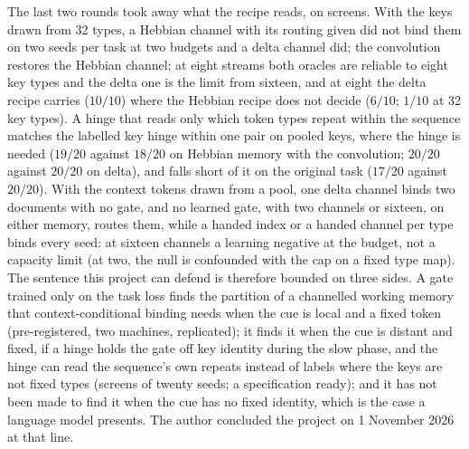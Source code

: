 \documentclass[11pt]{article}
\begin{document}
The last two rounds took away what the recipe reads, on screens. With the keys drawn from 32 types, a Hebbian channel with its routing given did not bind them on two seeds per task at two budgets and a delta channel did; the convolution restores the Hebbian channel; at eight streams both oracles are reliable to eight key types and the delta one is the limit from sixteen, and at eight the delta recipe carries ($10/10$) where the Hebbian recipe does not decide ($6/10$; $1/10$ at 32 key types). A hinge that reads only which token types repeat within the sequence matches the labelled key hinge within one pair on pooled keys, where the hinge is needed ($19/20$ against $18/20$ on Hebbian memory with the convolution; $20/20$ against $20/20$ on delta), and falls short of it on the original task ($17/20$ against $20/20$). With the context tokens drawn from a pool, one delta channel binds two documents with no gate, and no learned gate, with two channels or sixteen, on either memory, routes them, while a handed index or a handed channel per type binds every seed: at sixteen channels a learning negative at the budget, not a capacity limit (at two, the null is confounded with the cap on a fixed type map). The sentence this project can defend is therefore bounded on three sides. A gate trained only on the task loss finds the partition of a channelled working memory that context-conditional binding needs when the cue is local and a fixed token (pre-registered, two machines, replicated); it finds it when the cue is distant and fixed, if a hinge holds the gate off key identity during the slow phase, and the hinge can read the sequence's own repeats instead of labels where the keys are not fixed types (screens of twenty seeds; a specification ready); and it has not been made to find it when the cue has no fixed identity, which is the case a language model presents. The author concluded the project on 1 November 2026 at that line.
\end{document}
